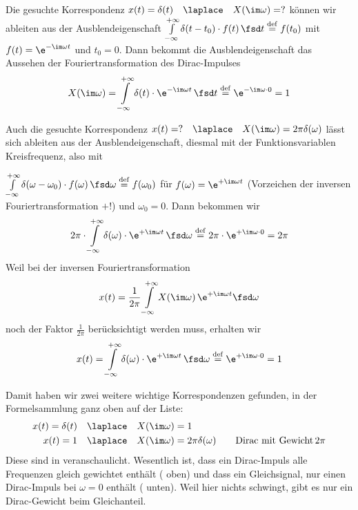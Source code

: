 \cleardoublepage
\begin{Ansatz}
Die gesuchte Korrespondenz $x(t)=\delta(t)\quad \laplace \quad X(\im\omega)=?$
können wir ableiten aus der Ausblendeigenschaft
$\int\limits_{-\infty}^{+\infty} \delta(t-t_0) \cdot f(t) \, \fsd t \stackrel{\mathrm{def}}= f(t_0)$
mit $f(t) = \e^{-\im \omega t}$ und $t_0=0$.
%
Dann bekommt die Ausblendeigenschaft das Aussehen der Fouriertransformation
des Dirac-Impulses
\begin{equation}
X(\im\omega) = \int\limits_{-\infty}^{+\infty} \delta(t) \cdot \e^{-\im \omega t} \, \fsd t \stackrel{\mathrm{def}}= \e^{-\im \omega \cdot 0} = 1
\end{equation}

Auch die gesuchte Korrespondenz
$x(t)= ? \quad \laplace \quad X(\im\omega)=2\pi \delta(\omega)$ lässt sich
ableiten aus der Ausblendeigenschaft, diesmal mit der Funktionsvariablen Kreisfrequenz, also mit

$\int\limits_{-\infty}^{+\infty} \delta(\omega-\omega_0) \cdot f(\omega) \, \fsd \omega \stackrel{\mathrm{def}}= f(\omega_0)$
für $f(\omega) = \e^{+\im \omega t}$ (Vorzeichen der inversen Fouriertransformation $+$!) und $\omega_0=0$.
%
Dann bekommen wir
\begin{equation}
2\pi \cdot \int\limits_{-\infty}^{+\infty} \delta(\omega) \cdot \e^{+\im \omega t} \, \fsd \omega \stackrel{\mathrm{def}}= 2\pi \cdot \e^{+\im \omega \cdot 0} = 2\pi
\end{equation}
%
Weil bei der inversen Fouriertransformation
\begin{align}
x(t) = \frac{1}{2\pi} \int\limits_{-\infty}^{+\infty} X(\im\omega) \, \e^{+\im \omega t} \fsd \omega
\end{align}
noch der Faktor $\frac{1}{2\pi}$ berücksichtigt werden muss, erhalten wir
\begin{equation}
x(t) = \int\limits_{-\infty}^{+\infty} \delta(\omega) \cdot \e^{+\im \omega t} \, \fsd \omega \stackrel{\mathrm{def}}= \e^{+\im \omega \cdot 0} = 1
\end{equation}

\end{Ansatz}
\begin{Loesung}
Damit haben wir zwei weitere wichtige Korrespondenzen gefunden, in der Formelsammlung
ganz oben auf der Liste:
\begin{align}
\label{eq:D410BDAAE0_Loesung1}
x(t)= \delta(t) &\quad \laplace \quad X(\im\omega)=1\\
\label{eq:D410BDAAE0_Loesung2}
x(t)= 1 &\quad \laplace \quad X(\im\omega)=2\pi \delta(\omega)\qquad \text{Dirac mit Gewicht}\,2\pi
\end{align}
%
Diese sind in  veranschaulicht.
%
Wesentlich ist, dass ein Dirac-Impuls alle Frequenzen gleich gewichtet enthält
( oben)
und dass ein Gleichsignal, nur einen Dirac-Impuls bei $\omega=0$ enthält
( unten).
Weil hier nichts schwingt, gibt es nur ein Dirac-Gewicht beim Gleichanteil.

\end{Loesung}
